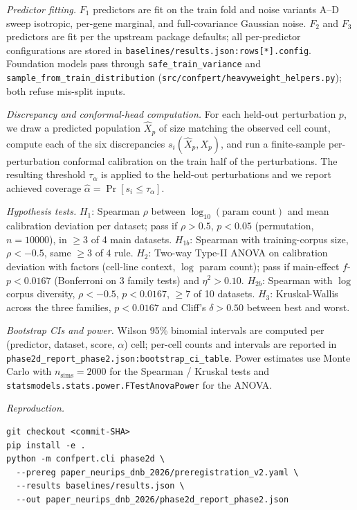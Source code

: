\documentclass[11pt]{article}
\begin{document}
\noindent\emph{Predictor fitting.}
$F_1$ predictors are fit on the train fold and noise variants A--D
sweep isotropic, per-gene marginal, and full-covariance Gaussian noise.
$F_2$ and $F_3$ predictors are fit per the upstream package defaults;
all per-predictor configurations are stored in
\texttt{baselines/results.json:rows[*].config}. Foundation models pass
through \texttt{safe\_train\_variance} and
\texttt{sample\_from\_train\_distribution}
(\texttt{src/confpert/heavyweight\_helpers.py}); both refuse mis-split
inputs.

\noindent\emph{Discrepancy and conformal-head computation.}
For each held-out perturbation $p$, we draw a predicted population
$\hat{X}_p$ of size matching the observed cell count, compute each of
the six discrepancies $s_i(\hat{X}_p, X_p)$, and run a finite-sample
per-perturbation conformal calibration on the train half of the
perturbations. The resulting threshold $\tau_\alpha$ is applied to the
held-out perturbations and we report achieved coverage
$\hat\alpha = \Pr[s_i \leq \tau_\alpha]$.

\noindent\emph{Hypothesis tests.}
$H_1$: Spearman $\rho$ between $\log_{10}(\text{param count})$ and mean
calibration deviation per dataset; pass if $\rho > 0.5$, $p < 0.05$
(permutation, $n = 10000$), in $\geq 3$ of 4 main datasets.
$H_{1b}$: Spearman with training-corpus size, $\rho < -0.5$, same
$\geq 3$ of 4 rule.
$H_2$: Two-way Type-II ANOVA on calibration deviation with factors
(cell-line context, $\log$ param count); pass if main-effect $f$-$p <
0.0167$ (Bonferroni on 3 family tests) and $\eta^2 > 0.10$.
$H_{2b}$: Spearman with $\log$ corpus diversity, $\rho < -0.5$,
$p < 0.0167$, $\geq 7$ of 10 datasets.
$H_3$: Kruskal-Wallis across the three families, $p < 0.0167$ and
Cliff's $\delta > 0.50$ between best and worst.

\noindent\emph{Bootstrap CIs and power.}
Wilson 95\% binomial intervals are computed per
(predictor, dataset, score, $\alpha$) cell; per-cell counts and
intervals are reported in
\texttt{phase2d\_report\_phase2.json:bootstrap\_ci\_table}. Power
estimates use Monte Carlo with $n_\text{sims} = 2000$ for the
Spearman / Kruskal tests and \texttt{statsmodels.stats.power.FTestAnovaPower}
for the ANOVA.

\noindent\emph{Reproduction.}
\begin{verbatim}
git checkout <commit-SHA>
pip install -e .
python -m confpert.cli phase2d \
  --prereg paper_neurips_dnb_2026/preregistration_v2.yaml \
  --results baselines/results.json \
  --out paper_neurips_dnb_2026/phase2d_report_phase2.json
\end{verbatim}
\end{document}
